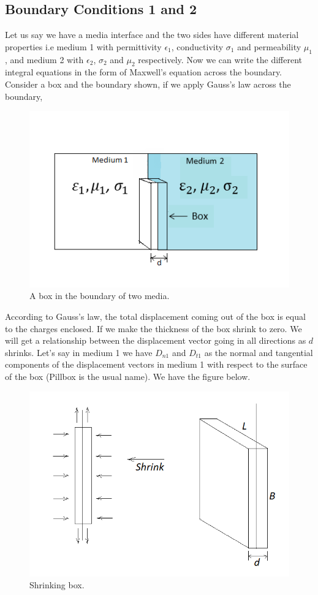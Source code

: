 \subsection{Boundary Conditions 1 and 2}
Let us say we have a media interface and the two sides have different material properties i.e medium 1 with permittivity $\epsilon_1$, conductivity $\sigma_1$ and permeability $\mu_1$, and medium 2 with $\epsilon_2$, $\sigma_2$ and $\mu_2$ respectively. Now we can write the different integral equations in the form of Maxwell's equation across the boundary. Consider a box and the boundary shown, if we apply Gauss's law across the boundary,
\begin{figure}[h]
\centering
\includegraphics[width=1.1\linewidth]{./graphics/box_in_boundary}
\caption{A box in the boundary of two media.}
\end{figure}

According to Gauss's law, the total displacement coming out of the box is equal to the charges enclosed. If we make the thickness of the box shrink to zero. We will get a relationship between the displacement vector going in all directions as $d$ shrinks.  Let's say in medium 1 we have $D_{n1}$ and $D_{t1}$ as the normal and tangential components of the displacement vectors in medium 1 with respect to the surface of the box (Pillbox is the usual name). We have the figure below.
\begin{figure}[h]
\centering
\includegraphics[width=.7\linewidth]{./graphics/diemedium2}
\caption{Shrinking box.}
\end{figure}

